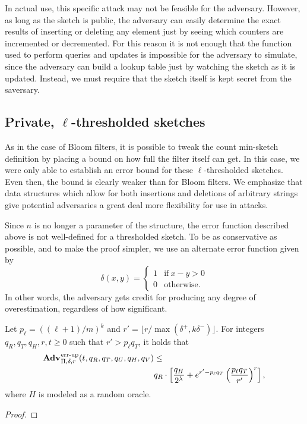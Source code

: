 In actual use, this specific attack may not be feasible for the adversary.
However, as long as the sketch is public, the adversary can easily determine the
exact results of inserting or deleting any element just by seeing which counters
are incremented or decremented. For this reason it is not enough that the
function used to perform queries and updates is impossible for the adversary to
simulate, since the adversary can build a lookup table just by watching the
sketch as it is updated. Instead, we must require that the sketch itself is kept
secret from the saversary.

\subsection{Private, $\ell$-thresholded sketches}

As in the case of Bloom filters, it is possible to tweak the count min-sketch
definition by placing a bound on how full the filter itself can get. In this
case, we were only able to establish an error bound for these $\ell$-thresholded
sketches. Even then, the bound is clearly weaker than for Bloom filters. We
emphasize that data structures which allow for both insertions and deletions of
arbitrary strings give potential adversaries a great deal more flexibility for
use in attacks.

Since $n$ is no longer a parameter of the structure, the error function
described above is not well-defined for a thresholded sketch. To be as
conservative as possible, and to make the proof simpler, we use an alternate
error function given by
\begin{equation}
  \delta(x, y) =
  \begin{cases}
    1 & \text{if}\ x - y > 0 \\
    0 & \text{otherwise.}
  \end{cases}
\end{equation}
In other words, the adversary gets credit for producing any degree of
overestimation, regardless of how significant.

\begin{theorem}\label{thm:scms-erreps-th}
Let $p_\ell = ((\ell+1)/m)^k$ and $r' = \lfloor r/\max(\delta^+,k\delta^-) \rfloor$. For integers $q_R, q_T, q_H, r, t \geq 0$ such
that $r' > p_\ell q_T$, it holds that
  \begin{equation*}
  \begin{aligned}
    \Adv{\errep}_{\Pi,\delta,r}(t, q_R,q_T,q_U,q_H,q_V) &\leq \\
     & q_R \cdot \left[\frac{q_H}{2^\lambda} + e^{r'-p_\ell q_T}\left(\frac{p_\ell q_T}{r'}\right)^r\right],
  \end{aligned}
\end{equation*}
where $H$ is modeled as a random oracle.
\end{theorem}

\begin{proof}
  
\end{proof}